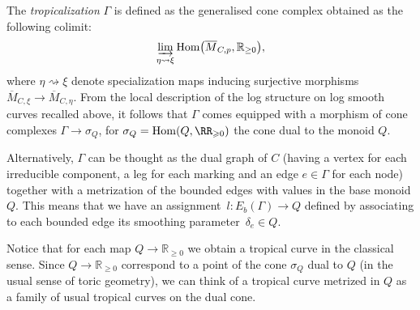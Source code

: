 The \emph{tropicalization} $\Gamma$ is defined as the generalised cone complex obtained as the following colimit:
\[
\varinjlim_{\eta\rightsquigarrow\xi} \operatorname{Hom}\bigl(\overline{M}_{C,p},\mathbb R_{\geq 0}\bigr),
\]
where $\eta\rightsquigarrow\xi$ denote specialization maps inducing surjective morphisms $\overline{M}_{C,\xi}\to\overline{M}_{C,\eta}$. From the local description of the log structure on log smooth curves recalled above, it follows that $\Gamma$ comes equipped with a morphism of cone complexes
$\Gamma\to\sigma_Q $,
for $\sigma_Q=\operatorname{Hom}(Q,\RR_{\geqslant 0})$ the cone dual to the monoid $Q$.

Alternatively, $\Gamma$ can be thought as the dual graph of $C$ (having a vertex for each irreducible component, a leg for each marking and an edge $e\in\Gamma$ for each node) together with a metrization of the bounded edges with values in the base monoid $Q$. This means that we have an assignment~${l\colon E_b(\Gamma)\to Q}$ defined by associating to each bounded edge its smoothing parameter~${\delta_e\in Q}$.

\begin{remarkk}
Notice that for each map $Q\to\mathbb R_{\geq 0}$ we obtain a tropical curve in the classical sense. Since $Q\to\mathbb R_{\geq 0}$ correspond to a point of the cone $\sigma_Q$ dual to $Q$ (in the usual sense of toric geometry), we can think of a tropical curve metrized in $Q$ as a family of usual tropical curves on the dual cone.
\end{remarkk}
